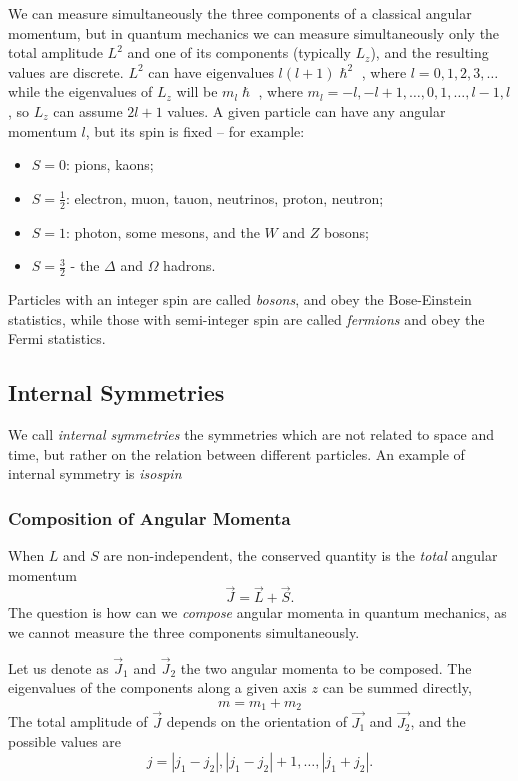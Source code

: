 We can measure simultaneously the three components of a classical angular momentum, but in quantum mechanics we can measure simultaneously only the total amplitude $L^2$ and one of its components (typically $L_{z}$), and the resulting values are discrete.
$L^2$ can have eigenvalues $l(l+1)\hslash^2$ , where $l=0,1,2,3,\dots$ while the eigenvalues of $L_{z}$ will be $m_{l}\hslash$ , where $m_l=-l,-l+1,\dots,0,1,\dots,l-1,l$ , so $L_z$
 can assume $2l+1$ values. A given particle can have any angular momentum $l$, but its spin is fixed -- for example:
 \begin{itemize}
     \item \(S=0\): pions, kaons;
     \item \(S=\frac{1}{2}\): electron, muon, tauon, neutrinos, proton, neutron;
     \item \(S=1\): photon, some mesons, and the \(W\) and \(Z\) bosons;
     \item \(S=\frac{3}{2}\) - the $\Delta$ and $\Omega$ hadrons.
 \end{itemize}
Particles with an integer spin are called \emph{bosons}, and obey the Bose-Einstein statistics, while those with semi-integer spin are called \emph{fermions} and obey the Fermi statistics.

\subsection{Internal Symmetries}
We call \emph{internal symmetries} the symmetries which are not related to space and time, but rather on the relation between different particles. An example of internal symmetry is \emph{isospin}

\subsubsection{Composition of Angular Momenta}
When \(L\) and \(S\) are non-independent, the conserved quantity is the \emph{total} angular momentum
\[
\vec{J}=\vec{L}+\vec{S}.
\]
The question is how can we \emph{compose} angular momenta in quantum mechanics, as we cannot measure the three components simultaneously. 

Let us denote as \(\vec{J}_1\) and \(\vec{J}_2\) the two angular momenta to be composed.
The eigenvalues of the components along a given axis \(z\) can be summed directly,
\[
m=m_{1}+m_{2}
\]
The total amplitude of \(\vec{J}\) depends on the orientation of $\vec{J_{1}} $ and $\vec{J_{2}}$, and the possible values are
\[
j=|j_{1}-j_{2}|,|j_{1}-j_{2}|+1,\dots,|j_{1}+j_{2}|.
\]

